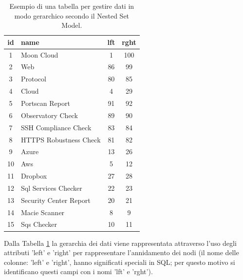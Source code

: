 \begin{table}[ht!]
\centering
\begin{tabular}[c]{| c | l | c | c |}
    \hline
    id & name & lft & rght \\ [0.5ex] 
    \hline
    \rowcolor{rootnodecell} 1 & Moon Cloud & 1 & 100 \\ [0.5ex] 
    \rowcolor{categorycell} 2 & Web & 86 & 99 \\ [0.5ex] 
    \rowcolor{categorycell} 3 & Protocol & 80 & 85 \\ [0.5ex] 
    \rowcolor{categorycell} 4 & Cloud & 4 & 29 \\ [0.5ex] 
    \rowcolor{evaluationcell} 5 & Portscan Report & 91 & 92 \\ [0.5ex] 
    \rowcolor{evaluationcell} 6 & Observatory Check & 89 & 90 \\ [0.5ex] 
    \rowcolor{evaluationcell} 7 & SSH Compliance Check & 83 & 84 \\ [0.5ex] 
    \rowcolor{evaluationcell} 8 & HTTPS Robustness Check & 81 & 82 \\ [0.5ex] 
    \rowcolor{categorycell} 9 & Azure & 13 & 26 \\ [0.5ex] 
    \rowcolor{categorycell} 10 & Aws & 5 & 12 \\ [0.5ex] 
    \rowcolor{categorycell} 11 & Dropbox & 27 & 28 \\ [0.5ex] 
    \rowcolor{evaluationcell} 12 & Sql Services Checker & 22 & 23 \\ [0.5ex] 
    \rowcolor{evaluationcell} 13 & Security Center Report & 20 & 21 \\ [0.5ex] 
    \rowcolor{evaluationcell} 14 & Macie Scanner & 8 & 9 \\ [0.5ex] 
    \rowcolor{evaluationcell} 15 & Sqs Checker & 10 & 11 \\ [0.5ex]
    \hline
\end{tabular}
\caption{Esempio di una tabella per gestire dati in modo gerarchico secondo il Nested Set Model.}
\label{table:nested_set_model_table}
\end{table}
\hfill\break
Dalla Tabella \ref{table:nested_set_model_table} la gerarchia dei dati viene rappresentata attraverso l'uso 
degli attributi 'left' e 'right' per rappresentare l'annidamento dei nodi (il nome delle colonne: 'left' e 'right', hanno significati 
speciali in SQL; per questo motivo si identificano questi campi con i nomi 'lft' e 'rght').
%
